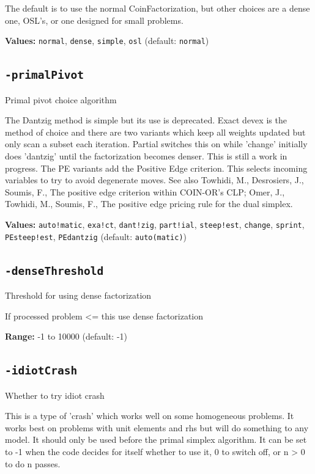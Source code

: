 \documentclass[11pt,a4paper]{article}
\begin{document}
The default is to use the normal CoinFactorization, but other choices are a dense one, OSL's, or one designed for small problems.

\textbf{Values:} \texttt{normal}, \texttt{dense}, \texttt{simple}, \texttt{osl} (default: \texttt{normal})

\subsection*{\texttt{-primalPivot}}

Primal pivot choice algorithm

The Dantzig method is simple but its use is deprecated.  Exact devex is the method of choice and there are two variants which keep all weights updated but only scan a subset each iteration. Partial switches this on while 'change' initially does 'dantzig' until the factorization becomes denser. This is still a work in progress. The PE variants add the Positive Edge criterion. This selects incoming variables to try to avoid degenerate moves. See also Towhidi, M., Desrosiers, J., Soumis, F., The positive edge criterion within COIN-OR's CLP; Omer, J., Towhidi, M., Soumis, F., The positive edge pricing rule for the dual simplex.

\textbf{Values:} \texttt{auto!matic}, \texttt{exa!ct}, \texttt{dant!zig}, \texttt{part!ial}, \texttt{steep!est}, \texttt{change}, \texttt{sprint}, \texttt{PEsteep!est}, \texttt{PEdantzig} (default: \texttt{auto(matic)})

\subsection*{\texttt{-denseThreshold}}

Threshold for using dense factorization

If processed problem <= this use dense factorization

\textbf{Range:} -1 to 10000 (default: -1)

\subsection*{\texttt{-idiotCrash}}

Whether to try idiot crash

This is a type of 'crash' which works well on some homogeneous problems. It works best on problems with unit elements and rhs but will do something to any model.  It should only be used before the primal simplex algorithm.  It can be set to -1 when the code decides for itself whether to use it, 0 to switch off, or n > 0 to do n passes.
\end{document}
